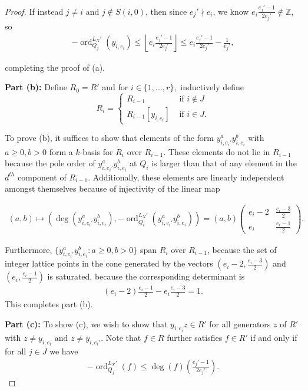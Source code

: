 \documentclass{amsart}
\theoremstyle{plain}
\theoremstyle{definition}
\theoremstyle{remark}
\numberwithin{equation}{section}
\newcommand\BZ{{\mathbb Z}}
\DeclareMathOperator{\ord}{ord}
\newcommand \subhalf[1]{\frac{{#1} - 1}{2{#1}}}
\newcommand{\halfcan}{L}
\begin{document}
\begin{proof}
If instead $j\ne i$ and $j \notin S(i,0)$, then since $e_j' \nmid e_i$, we know
$e_i\subhalf{e_j'} \notin \BZ$, so
\begin{align*}
	-\ord_{Q_j}
^{\halfcan_X'}(y_{i, e_i}) \leq \left\lfloor  e_i\subhalf{e_j'} \right\rfloor 
	\leq e_i\subhalf{e_j'} - \frac{1}{e_j'},
\end{align*}

\noindent
completing the proof of (a).

{\bf Part (b):}
Define $R_0 = R'$ and for $i \in \{1,\ldots, r\},$ inductively define 
$$R_i = \begin{cases}
	R_{i - 1} &\text{ if }i \notin J\\
	R_{i - 1}[y_{i, e_i}] &\text{ if }i \in J. 
\end{cases}$$

\noindent
To prove (b), it suffices to show that elements of the form $y_{i, e_
i'}^ay_{i, e_i}^b$ with $a \geq 0, b > 0$ form a $k$-basis for $R_{i}$ over $R_{i-1}$. These elements do not lie in $R_{i - 1}$ because the pole order of $y_{i, e_i'}^ay_{i,e_i}^b$ at $Q_i$ is larger than that of any element in the $d^{th}$ component of $R_{i - 1}$. 
Additionally, these elements are linearly independent amongst themselves because of
injectivity of the linear map

\begin{align*}
	(a,b) \mapsto \left( \deg\left(y_{i, e_i'}^ay_{i, e_i}^b\right),-
	\ord_{Q_i}
^{\halfcan_X'}\left( y_{i, e_i'}^ay_{i, e_i}^b \right)  \right) = (a,b) 
	\begin{pmatrix}
		e_i -2 & \frac{e_i -3}{2} \\
		e_i	 & \frac{e_i - 1}{2}
	\end{pmatrix}.
\end{align*}

\noindent
Furthermore, $\{y_{i, e_i'}^a y_{i, e_i}^b:a \geq 0,
b > 0\}$ span $R_i$ over $R_{i - 1}$, because the set of
integer lattice points in the cone generated by the vectors $\left(e
_i -2, \frac{e_i -3}{2} \right)$ and $\left(e_i, \frac{e_i - 1}{2}
\right)$ is saturated, because the corresponding determinant is
\begin{align*}
	(e_i -2) \frac{e_i - 1}{2} - e_i \frac{e_i -3}{2} = 1.
\end{align*}
This completes part (b).

{\bf Part (c):}
To show (c), we wish to show that $y_{i, e_i}z \in R'$ for all generators $z$ of $R'$
with $z \neq y_{i, e_i} \text{ and } z \neq y_{i, e_i'}$. Note that $f \in R$ further satisfies $f \in R'$ if and
only if for all $j \in J$ we have
\begin{align}
\label{eqn:order-degree}
	-\ord_{Q_j}
^{\halfcan_X'}(f) \leq \deg (f) \left( \subhalf {e_j'} \right).
\end{align}


\end{proof}
\end{document}
